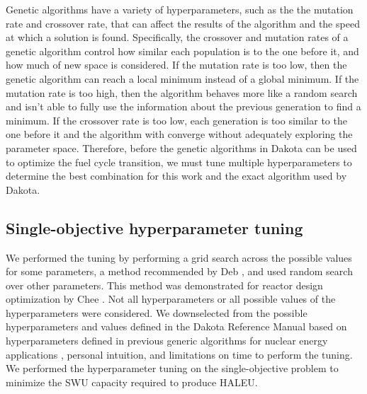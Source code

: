 Genetic algorithms have a variety of hyperparameters, such as the the 
mutation rate and crossover rate, that can affect 
the results of the algorithm and the speed at which a solution is found. 
Specifically, the crossover and mutation rates of a genetic algorithm 
control how similar each population is to the one before it, and how much 
of new space is considered. If the mutation rate is too low, then the 
genetic algorithm can reach a local minimum instead of a global 
minimum. If the mutation rate is too high, then the algorithm behaves more 
like a random search and isn't able to fully use the information about the 
previous generation to find a minimum. If the crossover rate is too low, 
each generation is too similar to the one before it and the algorithm 
with converge without adequately exploring the parameter space. 
Therefore, before the genetic algorithms in Dakota can be used to 
optimize the fuel cycle transition, we must tune multiple hyperparameters
to determine the best combination for this work and the exact algorithm 
used by Dakota.

\subsection{Single-objective hyperparameter tuning}
We performed the tuning by performing a grid search across 
the possible values for some parameters, a method recommended 
by Deb \cite{deb_multi-objective_2001}, and used random 
search over other parameters. This method was demonstrated for reactor 
design optimization by Chee \cite{chee_fluoride-salt-cooled_2022}. 
Not all hyperparameters or all possible values of the hyperparameters 
were considered. We downselected from 
the possible hyperparameters and values defined in the Dakota Reference 
Manual based on hyperparameters defined in previous generic algorithms 
for nuclear energy applications
\cite{passerini_systematic_2014,chee_fluoride-salt-cooled_2022},
personal intuition, and limitations on time to perform 
the tuning. We performed the hyperparameter tuning on the single-objective 
problem to minimize the \gls{SWU} capacity required to produce 
\gls{HALEU}. 

